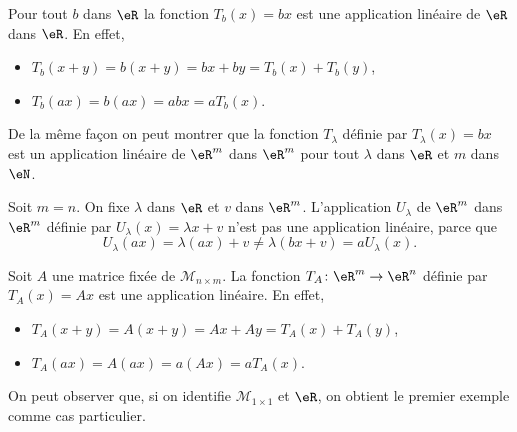 \begin{example}
Pour tout $b$ dans $\eR$ la fonction $T_b(x)= bx$ est une application linéaire de $\eR$ dans $\eR$. En effet,
\begin{itemize}
\item  $T_b(x+y)= b(x+y)= bx + by = T_b(x)+T_b(y)$,
\item $T_b(ax)=b(ax)= abx = a T_b(x)$.
\end{itemize}
De la même façon on peut montrer que la fonction $T_{\lambda}$ définie par $T_{\lambda}(x)=bx$ est un application linéaire de $\eR^m$ dans $\eR^m$ pour tout $\lambda$ dans $\eR$ et $m$ dans $\eN$.
\end{example}

\begin{example}\label{ex_affine}
	Soit $m=n$. On fixe $\lambda$ dans $\eR$ et $v$ dans $\eR^m$. L'application $U_{\lambda}$ de $\eR^m$ dans $\eR^m$ définie par $U_{\lambda}(x)=\lambda x+v$ n'est pas une application linéaire, parce que 
\[
U_{\lambda}(ax)=\lambda(ax)+v\neq \lambda(bx+v)=a U_{\lambda}(x).
\]
\end{example}

\begin{example}\label{exampleT_A}
	Soit $A$ une matrice fixée de $\mathcal{M}_{n\times m}$. La fonction $T_A\colon \eR^m\to \eR^n$ définie par $T_A(x)=Ax$ est une application linéaire. En effet, 
\begin{itemize}
\item  $T_A(x+y)= A(x+y)= Ax + Ay = T_A(x)+T_A(y)$,
\item $T_A(ax)=A(ax)= a(Ax) = a T_A(x)$.
\end{itemize}
\end{example}

On peut observer que, si on identifie $\mathcal{M}_{1\times 1}$ et $\eR$, on obtient le premier exemple comme cas particulier.

